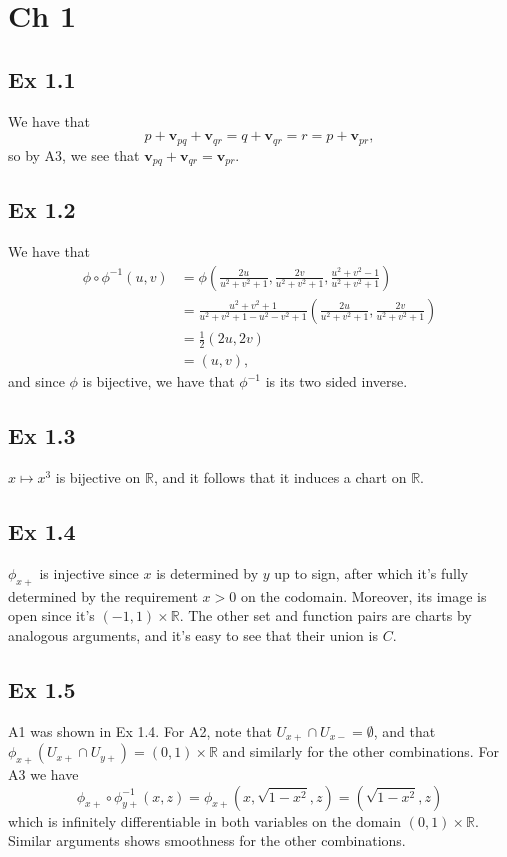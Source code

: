 \documentclass{article}
\theoremstyle{definition}
\newcommand{\R}{\mathbb{R}}
\begin{document}
\section*{Ch 1}

\subsection*{Ex 1.1}
We have that 
\[
	p + \mathbf{v}_{pq} + \mathbf{v}_{qr} = q + \mathbf{v}_{qr} = r = p + \mathbf{v}_{pr},
\]
so by A3, we see that $\mathbf{v}_{pq} + \mathbf{v}_{qr} = \mathbf{v}_{pr}$.


\subsection*{Ex 1.2}

We have that 
\begin{align*}
	\phi \circ \phi^{-1} (u, v)
	&=
	\phi\left(
		\frac{2u}{u^{2} + v^{2} + 1},
		\frac{2v}{u^{2} + v^{2} + 1},
		\frac{u^{2} + v^{2} - 1}{u^{2} + v^{2} + 1}
	\right) \\
	&=
	\frac{u^{2} + v^{2} + 1}{u^{2} + v^{2} + 1 -u^{2} - v^{2} + 1}
	\left(
		\frac{2u}{u^{2} + v^{2} + 1},
		\frac{2v}{u^{2} + v^{2} + 1}
	\right) \\
	&=
	\frac{1}{2}
	\left(
		2u,
		2v
	\right)  \\
	&=
	(u, v),
\end{align*}
and since $\phi$ is bijective, we have that $\phi^{-1}$ is its two sided
inverse.

\subsection*{Ex 1.3}

$x \mapsto x^{3}$ is bijective on $\mathbb{R}$, and it follows that it induces
a chart on $\mathbb{R}$.

\subsection*{Ex 1.4}
$\phi_{x+}$ is injective since $x$ is determined by $y$ up to sign, after which
it's fully determined by the requirement $x > 0$ on the codomain. Moreover, its
image is open since it's $(-1, 1) \times \R$. The other set and function pairs
are charts by analogous arguments, and it's easy to see that their union is
$C$.

\subsection*{Ex 1.5}
A1 was shown in Ex 1.4. For A2, note that $U_{x+} \cap U_{x-} = \emptyset$, and
that $\phi_{x+}(U_{x+} \cap U_{y+}) = (0, 1) \times \R$ and similarly for the
other combinations. For A3 we have
\[
	\phi_{x+} \circ \phi_{y+}^{-1} (x, z)
	=
	\phi_{x+} \left(x, \sqrt{1 - x^{2}}, z\right)
	=
	\left(\sqrt{1 - x^{2}}, z\right)
\]
which is infinitely differentiable in both variables on the domain $(0, 1)
\times \R$. Similar arguments shows smoothness for the other combinations.
\end{document}
